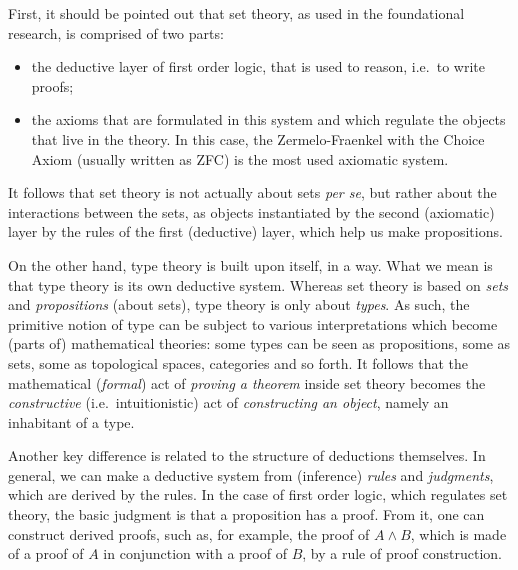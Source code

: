 First, it should be pointed out that set theory, as used in the foundational
research, is comprised of two parts:
\begin{itemize}
\item the deductive layer of first order logic, that is used to reason, i.e.\
  to write proofs;
\item the axioms that are formulated in this system and which regulate
  the objects that live in the theory. In this case, the Zermelo-Fraenkel
  with the Choice Axiom (usually written as ZFC) is the most used
  axiomatic system.
\end{itemize}
It follows that set theory is not actually about sets \emph{per se}, but
rather about the interactions between the sets, as objects instantiated
by the second (axiomatic) layer by the rules of the first (deductive) layer,
which help us make propositions.

On the other hand, type theory is built upon itself, in a way. What we
mean is that type theory is its own deductive system. Whereas set theory
is based on \emph{sets} and \emph{propositions} (about sets), type theory
is only about \emph{types}. As such, the primitive notion of type can be
subject to various interpretations which become (parts of) mathematical
theories: some types can be seen as propositions, some as sets, some as
topological spaces, categories and so forth. It follows that the mathematical
(\emph{formal}) act of \emph{proving a theorem} inside set theory becomes the
\emph{constructive} (i.e.\ intuitionistic) act of \emph{constructing an object},
namely an inhabitant of a type.

Another key difference is related to the structure of deductions themselves.
In general, we can make a deductive system from (inference) \emph{rules}
and \emph{judgments}, which are derived by the rules. In the case of
first order logic, which regulates set theory, the basic judgment is
that a proposition has a proof. From it, one can construct derived proofs,
such as, for example, the proof of $ A \land B $, which is made of a proof
of $ A $ in conjunction with a proof of $ B $, by a rule of proof construction.

